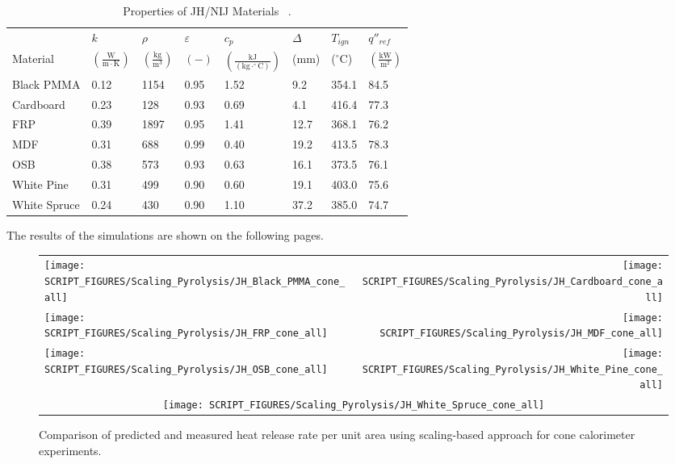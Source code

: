 \begin{table}[!h]
\caption[Properties of JH/NIJ Materials]{Properties of JH/NIJ Materials ~\cite{Lattimer:NIJ19}.}
\centering
\begin{tabular}{|p{5.5cm}|p{1.0cm}|p{1.0cm}|p{0.8cm}|p{1.4cm}|p{1.0cm}|p{1.0cm}|p{1.2cm}|}
\hline
                                               & $k$    & $\rho$      & $\varepsilon$   & $c_{p}$ & $\Delta$    & $T_{ign}$ & $q''_{ref}$ \\
Material                                       & $\mathrm{\left(\frac{W}{m\cdot K}\right)}$ & $\mathrm{\left(\frac{kg}{m^{3}}\right)}$ & $\mathrm{( - )}$ & $\mathrm{\left(\frac{kJ}{(kg\cdot ^{\circ}C)}\right)}$ &  ($\mathrm{mm}$)   & ($\mathrm{^{\circ}C}$) & $\mathrm{\left(\frac{kW}{m^{2}}\right)}$ \\ \hline
\hline
Black PMMA & 0.12 & 1154 & 0.95 & 1.52 & 9.2 & 354.1 & 84.5 \\ \hline
Cardboard & 0.23 & 128 & 0.93 & 0.69 & 4.1 & 416.4 & 77.3 \\ \hline
FRP & 0.39 & 1897 & 0.95 & 1.41 & 12.7 & 368.1 & 76.2 \\ \hline
MDF & 0.31 & 688 & 0.99 & 0.40 & 19.2 & 413.5 & 78.3 \\ \hline
OSB & 0.38 & 573 & 0.93 & 0.63 & 16.1 & 373.5 & 76.1 \\ \hline
White Pine & 0.31 & 499 & 0.90 & 0.60 & 19.1 & 403.0 & 75.6 \\ \hline
White Spruce & 0.24 & 430 & 0.90 & 1.10 & 37.2 & 385.0 & 74.7 \\ \hline
\end{tabular}
\label{Properties_JH_NIJ_Materials}
\end{table}

The results of the simulations are shown on the following pages.

\begin{figure}[p]
\begin{tabular*}{\textwidth}{l@{\extracolsep{\fill}}r}
\texttt{[image: SCRIPT\_FIGURES/Scaling\_Pyrolysis/JH\_Black\_PMMA\_cone\_all]} &
\texttt{[image: SCRIPT\_FIGURES/Scaling\_Pyrolysis/JH\_Cardboard\_cone\_all]} \\
\texttt{[image: SCRIPT\_FIGURES/Scaling\_Pyrolysis/JH\_FRP\_cone\_all]} &
\texttt{[image: SCRIPT\_FIGURES/Scaling\_Pyrolysis/JH\_MDF\_cone\_all]} \\
\texttt{[image: SCRIPT\_FIGURES/Scaling\_Pyrolysis/JH\_OSB\_cone\_all]} &
\texttt{[image: SCRIPT\_FIGURES/Scaling\_Pyrolysis/JH\_White\_Pine\_cone\_all]} \\
 \multicolumn{2}{c}{\texttt{[image: SCRIPT\_FIGURES/Scaling\_Pyrolysis/JH\_White\_Spruce\_cone\_all]}}
\end{tabular*}
\caption[HRRPUA of JH/NIJ materials using scaling model]
{Comparison of predicted and measured heat release rate per unit area using scaling-based approach for cone calorimeter experiments.}
\label{JH_NIJ_HRR_materials}
\end{figure}

